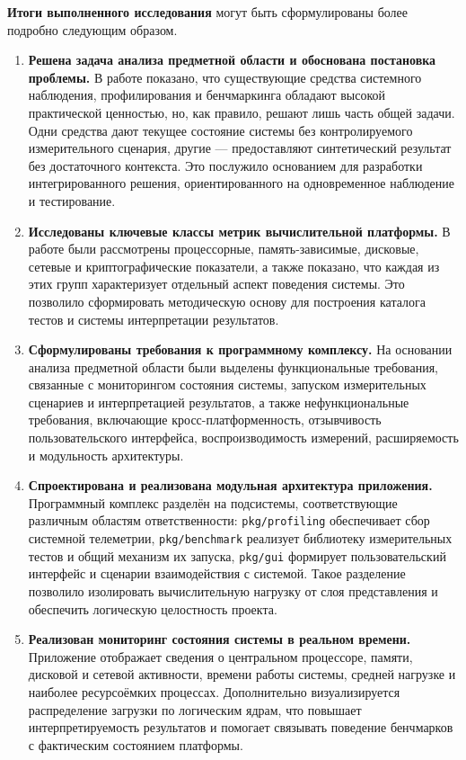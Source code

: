 \textbf{Итоги выполненного исследования} могут быть сформулированы более подробно следующим образом.
\begin{enumerate}
    \item \textbf{Решена задача анализа предметной области и обоснована постановка проблемы.} В работе показано, что существующие средства системного наблюдения, профилирования и бенчмаркинга обладают высокой практической ценностью, но, как правило, решают лишь часть общей задачи. Одни средства дают текущее состояние системы без контролируемого измерительного сценария, другие --- предоставляют синтетический результат без достаточного контекста. Это послужило основанием для разработки интегрированного решения, ориентированного на одновременное наблюдение и тестирование.
    \item \textbf{Исследованы ключевые классы метрик вычислительной платформы.} В работе были рассмотрены процессорные, память-зависимые, дисковые, сетевые и криптографические показатели, а также показано, что каждая из этих групп характеризует отдельный аспект поведения системы. Это позволило сформировать методическую основу для построения каталога тестов и системы интерпретации результатов.
    \item \textbf{Сформулированы требования к программному комплексу.} На основании анализа предметной области были выделены функциональные требования, связанные с мониторингом состояния системы, запуском измерительных сценариев и интерпретацией результатов, а также нефункциональные требования, включающие кросс-платформенность, отзывчивость пользовательского интерфейса, воспроизводимость измерений, расширяемость и модульность архитектуры.
    \item \textbf{Спроектирована и реализована модульная архитектура приложения.} Программный комплекс разделён на подсистемы, соответствующие различным областям ответственности: \texttt{pkg/profiling} обеспечивает сбор системной телеметрии, \texttt{pkg/benchmark} реализует библиотеку измерительных тестов и общий механизм их запуска, \texttt{pkg/gui} формирует пользовательский интерфейс и сценарии взаимодействия с системой. Такое разделение позволило изолировать вычислительную нагрузку от слоя представления и обеспечить логическую целостность проекта.
    \item \textbf{Реализован мониторинг состояния системы в реальном времени.} Приложение отображает сведения о центральном процессоре, памяти, дисковой и сетевой активности, времени работы системы, средней нагрузке и наиболее ресурсоёмких процессах. Дополнительно визуализируется распределение загрузки по логическим ядрам, что повышает интерпретируемость результатов и помогает связывать поведение бенчмарков с фактическим состоянием платформы.

\end{enumerate}
